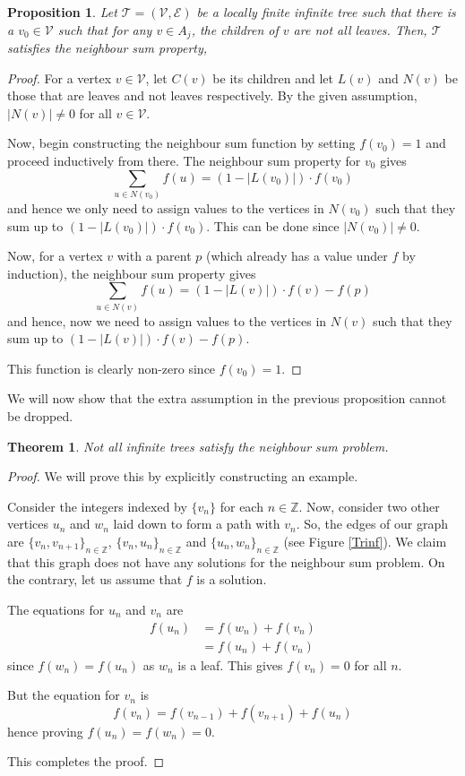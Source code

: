 \documentclass[11pt]{article}
\newtheorem{thm}[nummer]{Theorem}
\newtheorem{prp}[nummer]{Proposition}
\begin{document}
\begin{prp}
    Let $\mathcal T = (\mathcal V, \mathcal E)$ be a locally finite infinite tree such that there is a $v_0\in \mathcal V$ such that for any $v\in A_j$, the children of $v$ are not all leaves. Then, $\mathcal T$ satisfies the neighbour sum property,
\end{prp}
\begin{proof}
    For a vertex $v\in \mathcal V$, let $C(v)$ be its children and let $L(v)$ and $N(v)$ be those that are leaves and not leaves respectively. By the given assumption, $\left\lvert N(v)\right\rvert \neq 0$ for all $v\in \mathcal V$.

    Now, begin constructing the neighbour sum function by setting $f(v_0)=1$ and proceed inductively from there. The neighbour sum property for $v_0$ gives
    $$\sum_{u\in N(v_0)} f(u) = \left(1-\left\lvert L(v_0)\right\rvert\right)\cdot f(v_0)$$
    and hence we only need to assign values to the vertices in $N(v_0)$ such that they sum up to $\left(1-\left\lvert L(v_0)\right\rvert\right)\cdot f(v_0)$. This can be done since $\left\lvert N(v_0)\right\rvert \neq 0$.

    Now, for a vertex $v$ with a parent $p$ (which already has a value under $f$ by induction), the neighbour sum property gives
    $$\sum_{u\in N(v)} f(u) = \left(1-\left\lvert L(v)\right\rvert\right)\cdot f(v) - f(p)$$
    and hence, now we need to assign values to the vertices in $N(v)$ such that they sum up to $\left(1-\left\lvert L(v)\right\rvert\right)\cdot f(v) - f(p)$.

    This function is clearly non-zero since $f(v_0)=1$.
\end{proof}

We will now show that the extra assumption in the previous proposition cannot be dropped.
\begin{thm}
    Not all infinite trees satisfy the neighbour sum problem.
\end{thm}
\begin{proof}
    We will prove this by explicitly constructing an example.
    
    Consider the integers indexed by $\{v_n\}$ for each $n\in \mathbb Z$. Now, consider two other vertices $u_n$ and $w_n$ laid down to form a path with $v_n$. So, the edges of our graph are $\{v_n,v_{n+1}\}_{n\in \mathbb Z}$, $\{v_n,u_n\}_{n\in \mathbb Z}$ and $\{u_n,w_n\}_{n\in \mathbb Z}$ (see Figure \ref{Trinf}). We claim that this graph does not have any solutions for the neighbour sum problem. On the contrary, let us assume that $f$ is a solution.

    The equations for $u_n$ and $v_n$ are
    \begin{align*}
        f(u_n)&=f(w_n)+f(v_n)\\
        &=f(u_n)+f(v_n)
    \end{align*}
    since $f(w_n)=f(u_n)$ as $w_n$ is a leaf. This gives $f(v_n)=0$ for all $n$.

    But the equation for $v_n$ is
    $$f(v_n)=f(v_{n-1})+f(v_{n+1})+f(u_n)$$
    hence proving $f(u_n)=f(w_n)=0$.

    This completes the proof.
\end{proof}
\end{document}
